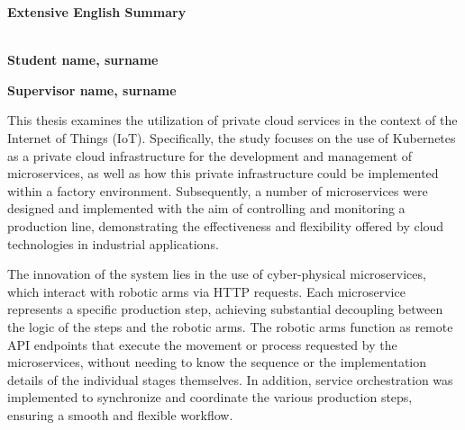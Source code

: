 \clearpage
{}
\begin{center}
  {\LARGE \textbf{Extensive English Summary}}\\[1cm]
  \textbf{\engdoctitle}\\[1cm]
  \begin{minipage}{0.38\textwidth}
    \begin{flushleft}
      \textbf{Student name, surname}\\
      \textbf{\nommesmallenglish}
    \end{flushleft}
  \end{minipage}
  \begin{minipage}{0.38\textwidth}
    \begin{flushright}
      \textbf{Supervisor name, surname}\\
      \textbf{\supnameegnlish}
    \end{flushright}
  \end{minipage}
\end{center}
\vspace{10mm}

This thesis examines the utilization of private cloud services in the context of the Internet of Things (IoT).
Specifically, the study focuses on the use of Kubernetes as a private cloud infrastructure for the development
and management of microservices, as well as how this private infrastructure could be implemented within
a factory environment. Subsequently, a number of microservices were designed and implemented with the aim of controlling
and monitoring a production line, demonstrating the effectiveness and flexibility offered by cloud technologies in
industrial applications.

The innovation of the system lies in the use of cyber-physical microservices, which interact with robotic arms
via HTTP requests. Each microservice represents a specific production step, achieving substantial decoupling
between the logic of the steps and the robotic arms. The robotic arms function as remote API endpoints that execute the
movement or process requested by the microservices, without needing to know the sequence or the implementation details
of the individual stages themselves. In addition, service orchestration was implemented to
synchronize and coordinate the various production steps, ensuring a smooth and flexible workflow.

